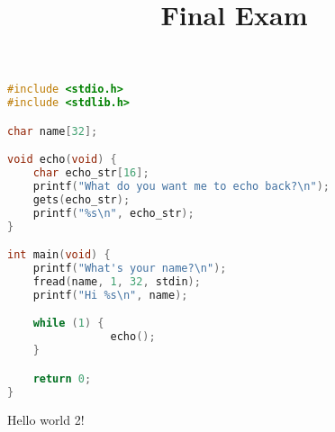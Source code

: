 \documentclass{cs161}
\title{Final Exam}
\begin{document}
\begin{questions}


\lipsum[1]



\lipsum[3]

\begin{lstlisting}[language=C]
#include <stdio.h>
#include <stdlib.h>

char name[32];

void echo(void) {
    char echo_str[16];
    printf("What do you want me to echo back?\n");
    gets(echo_str);
    printf("%s\n", echo_str);
}

int main(void) {
    printf("What's your name?\n");
    fread(name, 1, 32, stdin);
    printf("Hi %s\n", name);

    while (1) {
				echo();
    }

    return 0;
}
\end{lstlisting}

\end{questions}

\pagebreak

Hello world 2!
\end{document}
